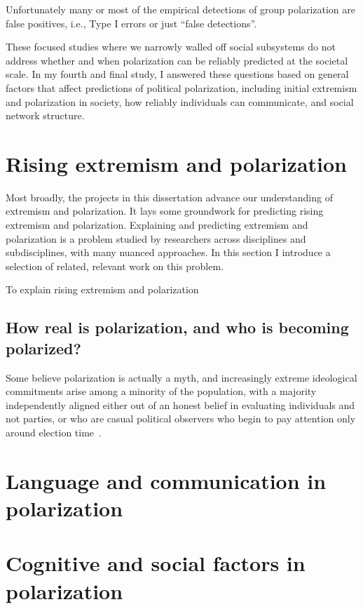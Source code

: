 \documentclass[12pt,letterpaper]{article}
\begin{document}
Unfortunately many or most of the empirical detections of group polarization
are false positives, i.e., Type I errors or just ``false detections''. 

These focused studies where we narrowly walled off social subsystems do not
address whether and when polarization can be reliably predicted at the
societal scale. In my fourth and final study, I answered these questions
based on general factors that affect predictions of political polarization, 
including initial extremism and polarization in society, how reliably individuals
can communicate, and social network structure. 


\section{Rising extremism and polarization}

Most broadly, the projects in this dissertation advance our understanding
of extremism and polarization. It lays some groundwork for predicting 
rising extremism and polarization. Explaining and predicting 
extremism and polarization is a problem studied by researchers across disciplines
and subdisciplines, with many nuanced approaches. In this section I 
introduce a selection of related, relevant work on this problem.

To explain rising extremism and polarization



\subsection{How real is polarization, and who is becoming polarized?}

Some believe polarization is actually a myth, and increasingly 
extreme ideological commitments arise among a minority of the population,
with a majority independently aligned either out of an honest belief in 
evaluating individuals and not parties, or who are casual political
observers who begin to pay attention only around election time~\cite{Kinder2017}.


\section{Language and communication in polarization}



\section{Cognitive and social factors in polarization}
\end{document}
